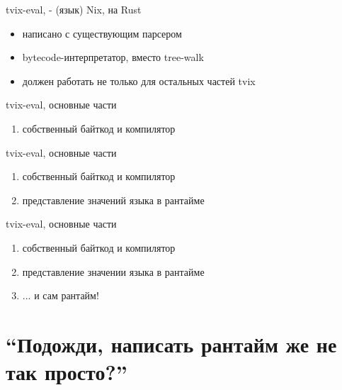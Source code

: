 \documentclass[12pt]{beamer}
\begin{document}
  \begin{frame}{tvix-eval, - (язык) Nix, на Rust}
    \begin{itemize}
    \item написано с существующим парсером
    \item bytecode-интерпретатор, вместо tree-walk
    \item должен работать не только для остальных частей tvix
    \end{itemize}
  \end{frame}

  \begin{frame}{tvix-eval, основные части}
    \begin{enumerate}
    \item собственный байткод и компилятор
    \end{enumerate}
  \end{frame}


  \begin{frame}{tvix-eval, основные части}
    \begin{enumerate}
    \item собственный байткод и компилятор
    \item представление значений языка в рантайме
    \end{enumerate}
  \end{frame}


  \begin{frame}{tvix-eval, основные части}
    \begin{enumerate}
    \item собственный байткод и компилятор
    \item представление значении языка в рантайме
    \item ... и сам рантайм!
    \end{enumerate}
  \end{frame}


  \section{``Подожди, написать рантайм же не так просто?''}

\end{document}
